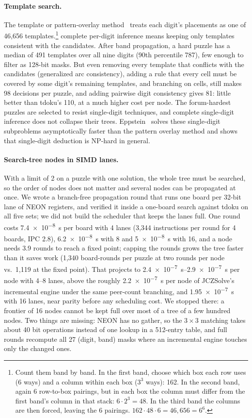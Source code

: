 \documentclass[11pt]{article}
\theoremstyle{definition}
\theoremstyle{plain}
\begin{document}
\paragraph{Template search.} The template or pattern-overlay method~\cite{stuart2008pom} treats each digit's placements as one
of 46{,}656 templates.\footnote{Count them band by band. In the first band, choose which box each row uses (6 ways)
and a column within each box ($3^3$ ways): 162. In the second band, again 6 row-to-box pairings, but in each box the
column must differ from the first band's column in that stack: $6\cdot 2^3=48$. In the third band the columns are then
forced, leaving the 6 pairings. $162\cdot 48\cdot 6 = 46{,}656 = 6^6$.} complete per-digit inference means keeping only templates consistent with the candidates. After
band propagation, a hard puzzle has a median of 491 templates over all nine digits (90th percentile 787), few enough
to filter as 128-bit masks. But even removing every template that conflicts with the
candidates (generalized arc consistency), adding a rule that every cell must be covered by some digit's remaining
templates, and branching on cells, still makes 98 decisions per puzzle, and adding pairwise digit consistency gives 81: little
better than tdoku's 110, at a much higher cost per node. The forum-hardest puzzles are selected to resist single-digit techniques, and complete single-digit inference does not
collapse their trees. Eppstein~\cite{eppstein2012single} solves these single-digit subproblems asymptotically faster
than the pattern overlay method and shows that single-digit deduction is NP-hard in general.

\paragraph{Search-tree nodes in SIMD lanes.} With a limit of 2 on a puzzle with one solution, the whole tree must be
searched, so the order of nodes does not matter and several nodes can be propagated at once. We wrote a branch-free
propagation round that runs one board per 32-bit lane of NEON registers, and verified it inside a one-board search
against tdoku on all five sets; we did not build the scheduler that keeps the lanes full. One round costs \SI{7.4e-8}{\second} per
board with 4 lanes (3{,}344 instructions per round for 4 boards, IPC 2.8), \SI{6.2e-8}{\second} with 8 and \SI{5e-8}{\second} with 16, and a
node needs 3.9 rounds to reach a fixed point; capping the rounds grows the tree faster than it saves work (1{,}340
board-rounds per puzzle at two rounds per node vs.\ 1{,}119 at the fixed point). That projects to \SIrange{2.4e-7}{2.9e-7}{\second} per
node with 4--8 lanes, above the roughly \SI{2.2e-7}{\second} per node of JCZSolve's incremental engine under the same peer-count
branching, and \SI{1.95e-7}{\second} with 16 lanes, near parity before any scheduling cost. We stopped there: a frontier of 16 nodes
cannot be kept full over most of a tree of a few hundred nodes. Two things are missing: NEON has no gather, so the $3\times 3$ matching takes about 40 bit
operations instead of one lookup in a 512-entry table, and full rounds recompute all 27 (digit, band) masks where an
incremental engine touches only the changed ones.
\end{document}
